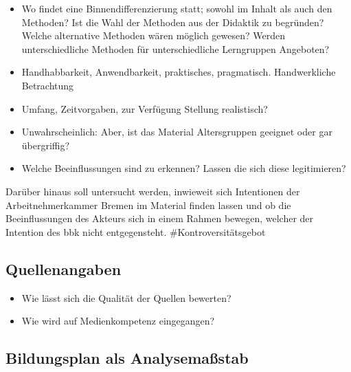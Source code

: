 \begin{itemize}
    \item Wo findet eine Binnendifferenzierung statt; sowohl im Inhalt als auch den Methoden? Ist die Wahl der Methoden aus der Didaktik zu begründen? Welche alternative Methoden wären möglich gewesen? Werden unterschiedliche Methoden für unterschiedliche Lerngruppen Angeboten?
    \item Handhabbarkeit, Anwendbarkeit, praktisches, pragmatisch. Handwerkliche Betrachtung
    \item Umfang, Zeitvorgaben, zur Verfügung Stellung realistisch?
    \item Unwahrscheinlich: Aber, ist das Material Altersgruppen geeignet oder gar übergriffig?
    \item Welche Beeinflussungen sind zu erkennen? Lassen die sich diese legitimieren?
\end{itemize}
Darüber hinaus soll untersucht werden, inwieweit sich Intentionen der Arbeitnehmerkammer Bremen im Material finden lassen und ob die Beeinflussungen des Akteurs sich in einem Rahmen bewegen, welcher der Intention des \gls{bbk} nicht entgegensteht. \#Kontroversitätsgebot 

\subsection{Quellenangaben}
\begin{itemize}
    \item Wie lässt sich die Qualität der Quellen bewerten?
    \item Wie wird auf Medienkompetenz eingegangen?
 \end{itemize}





















\subsection{Bildungsplan als Analysemaßstab}


